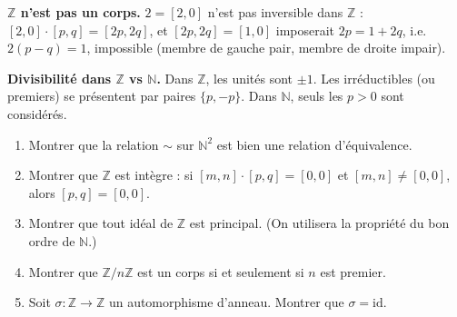 \vspace{6pt}

\begin{mdframed}[style=cexbar]
  \textbf{$\mathbb{Z}$ n'est pas un corps.}\enspace%
  $2 = [2,0]$ n'est pas inversible dans $\mathbb{Z}$ : $[2,0]\cdot[p,q]=[2p,2q]$,
  et $[2p,2q]=[1,0]$ imposerait $2p = 1+2q$, i.e.\ $2(p-q)=1$, impossible
  (membre de gauche pair, membre de droite impair).

  \smallskip\noindent
  \textbf{Divisibilité dans $\mathbb{Z}$ vs $\mathbb{N}$.}\enspace%
  Dans $\mathbb{Z}$, les unités sont $\pm 1$. Les irréductibles (ou premiers)
  se présentent par paires $\{p, -p\}$. Dans $\mathbb{N}$, seuls les $p > 0$
  sont considérés.
\end{mdframed}

\vspace{6pt}
\exolabel

\begin{mdframed}[style=exobar]
  \begin{enumerate}
    \item Montrer que la relation $\sim$ sur $\mathbb{N}^2$ est bien une relation
          d'équivalence.

    \item Montrer que $\mathbb{Z}$ est intègre : si $[m,n]\cdot[p,q]=[0,0]$
          et $[m,n]\neq[0,0]$, alors $[p,q]=[0,0]$.

    \item Montrer que tout idéal de $\mathbb{Z}$ est principal.
          (On utilisera la propriété du bon ordre de $\mathbb{N}$.)

    \item Montrer que $\mathbb{Z}/n\mathbb{Z}$ est un corps si et seulement si
          $n$ est premier.

    \item Soit $\sigma : \mathbb{Z} \to \mathbb{Z}$ un automorphisme d'anneau.
          Montrer que $\sigma = \mathrm{id}$.
  \end{enumerate}
\end{mdframed}

